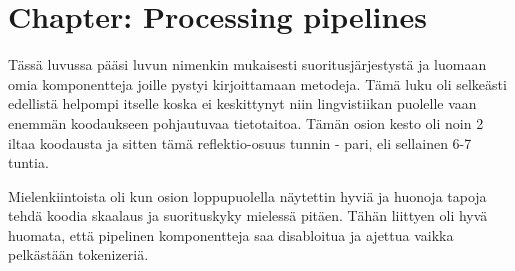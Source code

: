 \documentclass{article}
\begin{document}
\section{Chapter: Processing pipelines} 

Tässä luvussa pääsi luvun nimenkin mukaisesti suoritusjärjestystä ja luomaan omia komponentteja joille pystyi kirjoittamaan metodeja.
Tämä luku oli selkeästi edellistä helpompi itselle koska ei keskittynyt niin lingvistiikan puolelle vaan enemmän koodaukseen pohjautuvaa tietotaitoa. Tämän osion kesto oli noin 2 iltaa koodausta ja sitten tämä reflektio-osuus tunnin - pari, eli sellainen 6-7 tuntia.

Mielenkiintoista oli kun osion loppupuolella näytettin hyviä ja huonoja tapoja tehdä koodia skaalaus ja suorituskyky mielessä pitäen. Tähän liittyen oli hyvä huomata, että pipelinen komponentteja saa disabloitua ja ajettua vaikka pelkästään tokenizeriä.
\end{document}
